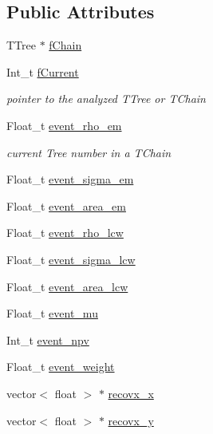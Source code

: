 \subsection*{Public Attributes}
\begin{DoxyCompactItemize}
\item 
T\+Tree $\ast$ \hyperlink{classJetAnalysisExample_a090da0fb10035cc39aa2e4348585455a}{f\+Chain}
\item 
Int\+\_\+t \hyperlink{classJetAnalysisExample_a2ec4e7a056127074ae938d22d0954321}{f\+Current}
\begin{DoxyCompactList}\small\item\em pointer to the analyzed T\+Tree or T\+Chain \end{DoxyCompactList}\item 
Float\+\_\+t \hyperlink{classJetAnalysisExample_aa1d531f8f949690807d93163ccb2c6b3}{event\+\_\+rho\+\_\+em}
\begin{DoxyCompactList}\small\item\em current Tree number in a T\+Chain \end{DoxyCompactList}\item 
Float\+\_\+t \hyperlink{classJetAnalysisExample_a3d57da2d51b3f1d40ca89e459c9cc0f4}{event\+\_\+sigma\+\_\+em}
\item 
Float\+\_\+t \hyperlink{classJetAnalysisExample_a16b37a5bb3166a812194875aca5acc0d}{event\+\_\+area\+\_\+em}
\item 
Float\+\_\+t \hyperlink{classJetAnalysisExample_a9d09e6cb1e0678468265c7da7f7c8103}{event\+\_\+rho\+\_\+lcw}
\item 
Float\+\_\+t \hyperlink{classJetAnalysisExample_a0cd477c0a661dc1c0fa55f5b43a6ad2c}{event\+\_\+sigma\+\_\+lcw}
\item 
Float\+\_\+t \hyperlink{classJetAnalysisExample_a1e74e9277008b947c34a55496b22dfd4}{event\+\_\+area\+\_\+lcw}
\item 
Float\+\_\+t \hyperlink{classJetAnalysisExample_ac51d117a33c649738571c91306b18d5d}{event\+\_\+mu}
\item 
Int\+\_\+t \hyperlink{classJetAnalysisExample_a457779d5e02cd56145e7001a9a2cd6ca}{event\+\_\+npv}
\item 
Float\+\_\+t \hyperlink{classJetAnalysisExample_a26cfa953a3d250e280fc527db140a16d}{event\+\_\+weight}
\item 
vector$<$ float $>$ $\ast$ \hyperlink{classJetAnalysisExample_ab329534c3fc5e2316145f226f16482f5}{recovx\+\_\+x}
\item 
vector$<$ float $>$ $\ast$ \hyperlink{classJetAnalysisExample_af7cc1be86bd97eb84b8f8ee222907c26}{recovx\+\_\+y}

\end{DoxyCompactItemize}
